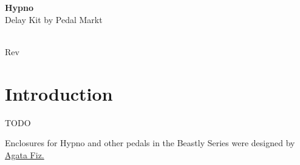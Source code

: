 \documentclass[a4paper,12pt]{article}
\begin{document}
\begin{titlepage}
  \begin{center}
    \Large\textbf{Hypno}\\
    \large{Delay Kit by Pedal Markt}
  \end{center}
  \vspace*{\fill}
  \begin{center}
    \vhCurrentDate\\
    { Rev}\vhCurrentVersion
  \end{center}
\end{titlepage}

\tableofcontents
\pagebreak

\section{Introduction}

TODO

Enclosures for Hypno and other pedals in the Beastly Series
were designed by \href{https://fiz.gallery/}{Agata Fiz.}
\end{document}
